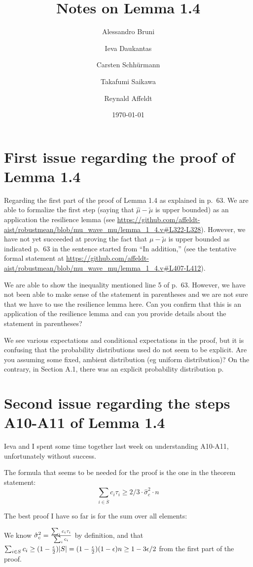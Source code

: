 \documentclass[11pt]{article}
\author[1]{Alessandro Bruni}
\author[1]{Ieva Daukantas}
\author[1]{Carsten Schhürmann}
\author[2]{Takafumi Saikawa}
\author[2]{Reynald Affeldt}
\affil[1]{IT University of Copenhagen, Denmark}
\affil[2]{National Institute of Advanced Industrial Science and Technology, Japan}
\date{\today}
\title{Notes on Lemma 1.4}
\begin{document}
\maketitle

\section{First issue regarding the proof of Lemma 1.4}

Regarding the first part of the proof of Lemma 1.4 as explained in p.\ 63.
We are able to formalize the first step (saying that $\hat\mu - \widetilde{\mu}$ is
upper bounded) as an application the resilience lemma (see
\url{https://github.com/affeldt-aist/robustmean/blob/mu_wave_mu/lemma_1_4.v#L322-L328}).
However, we have not yet succeeded at proving the fact that $\mu - \widetilde{\mu}$
is upper bounded as indicated p.\ 63 in the sentence started from ``In addition,''
(see the tentative formal statement at
\url{https://github.com/affeldt-aist/robustmean/blob/mu_wave_mu/lemma_1_4.v#L407-L412}).

We are able to show the inequality mentioned line 5 of p.\ 63. However,
we have not been able to make sense of the statement in parentheses and we are
not sure that we have to use the resilience lemma here.
Can you confirm that this is an application of the resilience lemma
and can you provide details about the statement in parentheses?

We see various expectations and conditional expectations in the proof, but it is confusing
that the probability distributions used do not seem to be explicit.
Are you assuming some fixed, ambient distribution (eg uniform distribution)?
On the contrary, in Section A.1, there was an explicit probability distribution p.

\section{Second issue regarding the steps A10-A11 of Lemma 1.4}

Ieva and I spent some time together last week on understanding A10-A11, unfortunately without success.

The formula that seems to be needed for the proof is the one in the theorem statement:
\[ \sum_{i \in \overline S} c_i \tau_i \ge 2/3 \cdot \hat\sigma_c^2 \cdot n \]

The best proof I have so far is for the sum over all elements:

We know \(\hat\sigma_c^2 = {\sum_i c_i \tau_i \over \sum_i c_i}\) by definition, and that  \(\sum_{i \in S} c_i \ge (1-{\epsilon\over 2})|S| = (1-{\epsilon\over 2})(1-\epsilon)n \ge 1-3\epsilon/2\) from the first part of the proof.
\end{document}
